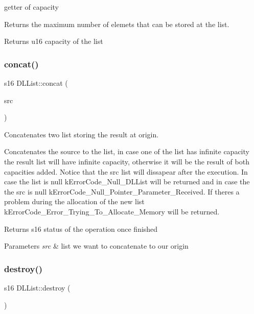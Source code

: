 getter of capacity 

Returns the maximum number of elemets that can be stored at the list.

\begin{DoxyReturn}{Returns}
u16 capacity of the list 
\end{DoxyReturn}
\mbox{\label{class_d_l_list_a69006862d24e4d69a3dd87b93d5025ef}} 
\subsubsection{\texorpdfstring{concat()}{concat()}}
{\footnotesize\ttfamily s16 D\+L\+List\+::concat (\begin{DoxyParamCaption}\item[{\hyperlink{class_d_l_list}{D\+L\+List} $\ast$}]{src }\end{DoxyParamCaption})}



Concatenates two list storing the result at origin. 

Concatenates the source to the list, in case one of the list has infinite capacity the result list will have infinite capacity, otherwise it will be the result of both capacities added. Notice that the src list will dissapear after the execution. In case the list is null k\+Error\+Code\+\_\+\+Null\+\_\+\+D\+L\+List will be returned and in case the the src is null k\+Error\+Code\+\_\+\+Null\+\_\+\+Pointer\+\_\+\+Parameter\+\_\+\+Received. If there\textquotesingle{}s a problem during the allocation of the new list k\+Error\+Code\+\_\+\+Error\+\_\+\+Trying\+\_\+\+To\+\_\+\+Allocate\+\_\+\+Memory will be returned.

\begin{DoxyReturn}{Returns}
s16 status of the operation once finished 
\end{DoxyReturn}

\begin{DoxyParams}{Parameters}
{\em src} & list we want to concatenate to our origin \\
\hline
\end{DoxyParams}
\mbox{\label{class_d_l_list_a09f41b245e07d6d57a4d5c7cc0df1ae8}} 
\subsubsection{\texorpdfstring{destroy()}{destroy()}}
{\footnotesize\ttfamily s16 D\+L\+List\+::destroy (\begin{DoxyParamCaption}{ }\end{DoxyParamCaption})}



